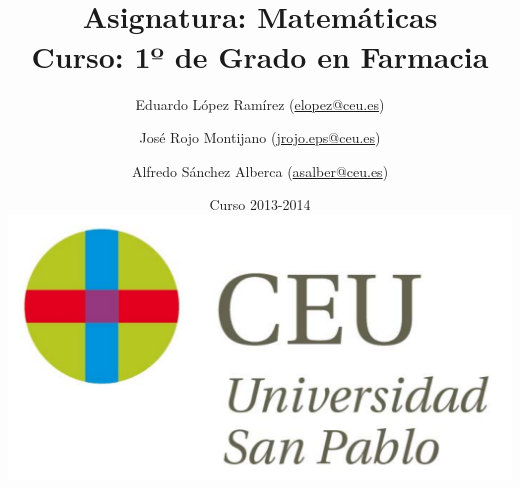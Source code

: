 \documentclass[a4paper,titlepage,dvips]{article}
\begin{document}
\sloppy

\title{\vskip 2cm
\shadowbox{\Huge \textbf{\textsf{\quad \textcolor[rgb]{0.00,0.00,0.50}{EJERCICIOS DE CÁLCULO}\quad}}}\\
   \vskip 1cm
   {\Large \textsf{\textcolor[rgb]{0.50,0.00,0.25}{Asignatura: Matemáticas }}}\\
   {\Large \textsf{\textcolor[rgb]{0.50,0.00,0.25}{Curso: 1º de Grado en Farmacia}}}
   }
\author{
   Eduardo López Ramírez (\url{elopez@ceu.es})
   \and
   José Rojo Montijano (\url{jrojo.eps@ceu.es})
   \and
   Alfredo Sánchez Alberca (\url{asalber@ceu.es})
}
\date{Curso 2013-2014\\[1cm]
\includegraphics[scale=0.3]{img/logo_uspceu_01}}

\maketitle
\tableofcontents
\newpage














%
%
%



%
\end{document}
